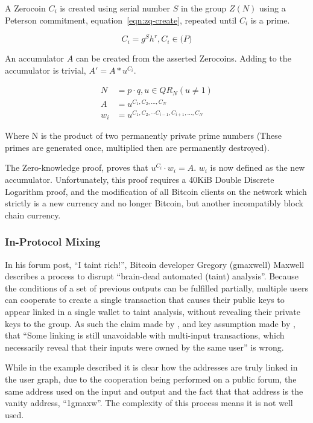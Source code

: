 A Zerocoin $C_{i}$ is created using serial number $S$ in the group $Z(N)$ using a Peterson commitment, equation~\ref{eqn:zq-create}, repeated until $C_i$ is a prime.

\begin{equation}\label{eqn:zq-create}
C_{i}=g^Sh^r, C_i \in \mathbb(P)
\end{equation}

An accumulator $A$ can be created from the asserted Zerocoins.  Adding to the accumulator is trivial, $A' = A*u^{C_i}$.

\begin{subequations}
    \begin{align}\label{eqn:zkp}
        N &= p \cdot q, u \in QR_{N}(u\neq1)\\
        A &= u^{C_1, C_2,\dots,C_N}\\
        w_i &=  u^{C_1, C_2,\cdots C_{i-1}, C_{i+1}, \dots ,C_N}
    \end{align}
\end{subequations}

Where N is the product of two permanently private prime numbers (These primes are generated once, multiplied then are permanently destroyed).

The Zero-knowledge proof, proves that $u^{C_i} \cdot w_i = A$. $w_i$ is now defined as the new accumulator. Unfortunately, this proof requires a 40KiB Double Discrete Logarithm proof, and the modification of all Bitcoin clients on the network which strictly is a new currency and no longer Bitcoin, but another incompatibly block chain currency.

\subsubsection{In-Protocol Mixing}
In his forum post, ``I taint rich!'', Bitcoin developer Gregory (gmaxwell) Maxwell describes a process to disrupt ``brain-dead automated (taint) analysis''.  Because the conditions of a set of previous outputs can be fulfilled partially, multiple users can cooperate to create a single transaction that causes their public keys to appear linked in a single wallet to taint analysis, without revealing their private keys to the group.  As such the claim made by \textcite{satoshi}, and key assumption made by \textcite{reid-anon}, that ``Some linking is still unavoidable with multi-input transactions, which necessarily reveal that their inputs were owned by the same user'' is wrong.


While in the example described it is clear how the addresses are truly linked in the user graph, due to the cooperation being performed on a public forum, the same address used on the input and output and the fact that that address is the vanity address, ``1gmaxw''. The complexity of this process means it is not well used.


